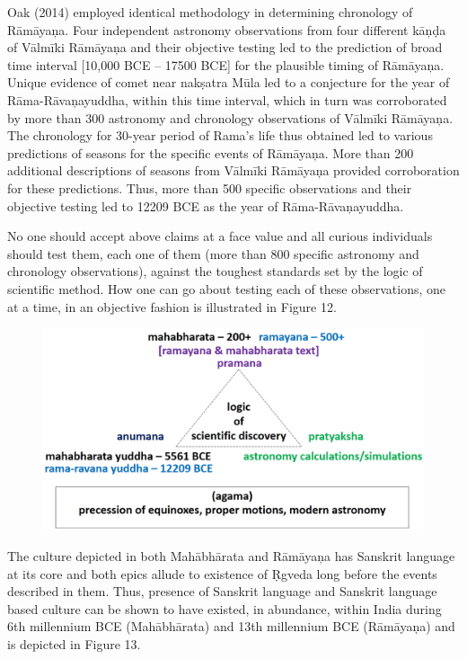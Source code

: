 Oak (2014) employed identical methodology in determining chronology of Rāmāyaņa. Four independent astronomy observations from four different kāņḍa of Vālmīki Rāmāyaņa and their objective testing led to the prediction of broad time interval [10,000 BCE – 17500 BCE] for the plausible timing of Rāmāyaņa. Unique evidence of comet near nakṣatra Mūla led to a conjecture for the year of Rāma-Rāvaņayuddha, within this time interval, which in turn was corroborated by more than 300 astronomy and chronology observations of Vālmīki Rāmāyaņa. The chronology for 30-year period of Rama’s life thus obtained led to various predictions of seasons for the specific events of Rāmāyaņa. More than 200 additional descriptions of seasons from Vālmīki Rāmāyaņa provided corroboration for these predictions. Thus, more than 500 specific observations and their objective testing led to 12209 BCE as the year of Rāma-Rāvaņayuddha.

No one should accept above claims at a face value and all curious individuals should test them, each one of them (more than 800 specific astronomy and chronology observations), against the toughest standards set by the logic of scientific method. How one can go about testing each of these observations, one at a time, in an objective fashion is illustrated in Figure 12.

\begin{figure}[!htbp]
\includegraphics[scale=0.18]{images/8-12.jpg}
\caption{}\label{art8-fig12}
\end{figure}

The culture depicted in both Mahābhārata and Rāmāyaņa has Sanskrit language at its core and both epics allude to existence of Ṛgveda long before the events described in them. Thus, presence of Sanskrit language and Sanskrit language based culture can be shown to have existed, in abundance, within India during 6th millennium BCE (Mahābhārata) and 13th millennium BCE (Rāmāyaņa) and is depicted in Figure 13.

